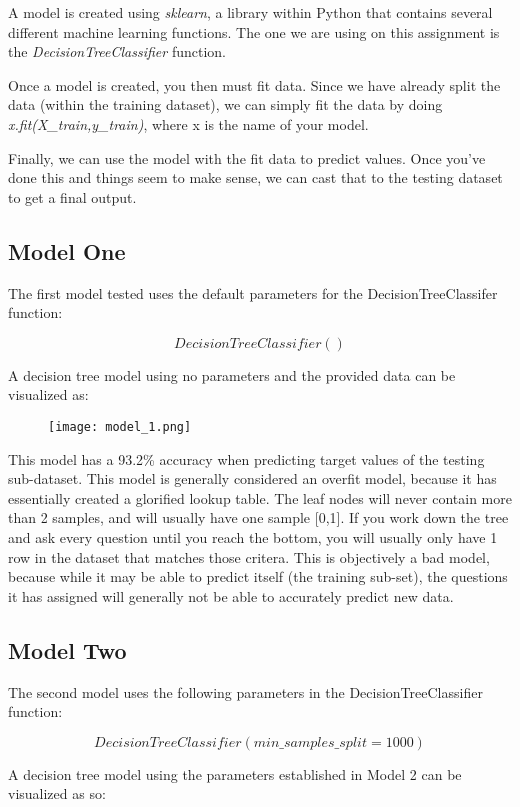 \documentclass[notitlepage]{report}
\begin{document}
A model is created using \textit{sklearn}, a library within Python that contains several different machine learning functions. The one we are using on this assignment is the \textit{DecisionTreeClassifier} function.

Once a model is created, you then must fit data. Since we have already split the data (within the training dataset), we can simply fit the data by doing \textit{x.fit(X\_train,y\_train)}, where x is the name of your model.

Finally, we can use the model with the fit data to predict values. Once you've done this and things seem to make sense, we can cast that to the testing dataset to get a final output.

\subsection*{Model One}
The first model tested uses the default parameters for the DecisionTreeClassifer function:

$$
DecisionTreeClassifier()
$$

A decision tree model using no parameters and the provided data can be visualized as:

\begin{figure}[H]
	\centering
	\texttt{[image: model\_1.png]}
\end{figure}

This model has a 93.2\% accuracy when predicting target values of the testing sub-dataset. This model is generally considered an overfit model, because it has essentially created a glorified lookup table. The leaf nodes will never contain more than 2 samples, and will usually have one sample [0,1]. If you work down the tree and ask every question until you reach the bottom, you will usually only have 1 row in the dataset that matches those critera. This is objectively a bad model, because while it may be able to predict itself (the training sub-set), the questions it has assigned will generally not be able to accurately predict new data.

\subsection*{Model Two}
The second model uses the following parameters in the DecisionTreeClassifier function:

$$
DecisionTreeClassifier(min\_samples\_split=1000)
$$

A decision tree model using the parameters established in Model 2 can be visualized as so:
\end{document}
